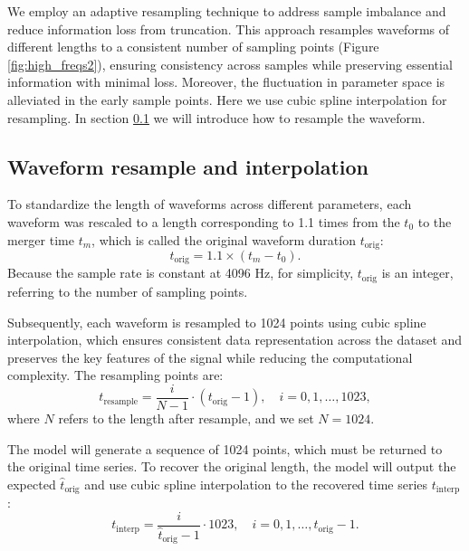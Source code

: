 \documentclass[
reprint,
superscriptaddress,
amsmath,amssymb,
aps,
prd,
floatfix,
]{revtex4-2}
\begin{document}
We employ an adaptive resampling technique to address sample imbalance and reduce information loss from truncation. This approach resamples waveforms of different lengths to a consistent number of sampling points (Figure \ref{fig:high_freqs2}), ensuring consistency across samples while preserving essential information with minimal loss. 
Moreover, the fluctuation in parameter space is alleviated in the early sample points. 
Here we use cubic spline interpolation for resampling.
In section \ref{subsec:resample} we will introduce how to resample the waveform.

\subsection{Waveform resample and interpolation}
\label{subsec:resample}
To standardize the length of waveforms across different parameters, each waveform was rescaled to a length corresponding to 1.1 times from the $t_0$ to the merger time $t_m$, which is called the original waveform duration $t_{\text{orig}}$:
\begin{equation}
    t_{\text{orig}} = 1.1\times(t_m - t_0).
\end{equation}
Because the sample rate is constant at 4096 Hz, for simplicity, $ t_{\text{orig}}$ is an integer, referring to the number of sampling points.

Subsequently, each waveform is resampled to 1024 points using cubic spline interpolation, which ensures consistent data representation across the dataset and preserves the key features of the signal while reducing the computational complexity. 
The resampling points are:
\begin{equation}
    t_{\text{resample}} = \frac{i}{N-1} \cdot (t_{\text{orig}} - 1), \quad i = 0, 1, \dots, 1023,
    \label{equ:resample}
\end{equation}
where $N$ refers to the length after resample, and we set $N=1024$.

The model will generate a sequence of 1024 points, which must be returned to the original time series. To recover the original length, the model will output the expected $\hat{t}_{\text{orig}}$ and use cubic spline interpolation to the recovered time series $t_{\text{interp}}$:
\begin{equation}
    t_{\text{interp}} = \frac{i}{\hat{t}_{\text{orig}}-1} \cdot 1023, \quad i = 0, 1, \dots, \hat{t}_{\text{orig}}-1.
\end{equation}
\end{document}
